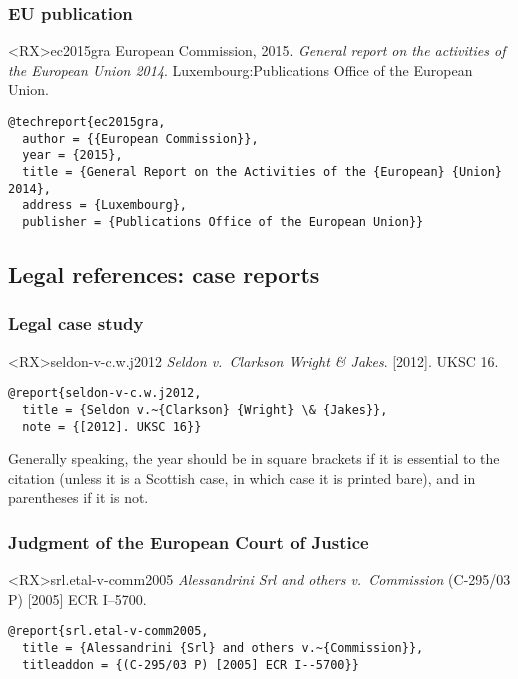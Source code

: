 \documentclass[10pt,a4paper]{article}
\newenvironment{info}{%
  \begin{list}{\makebox[2em][c]{\faInfoCircle}}{%
    \setlength{\leftmargin}{2em}
    \setlength{\labelwidth}{2em}
    \setlength{\labelsep}{0pt}}
}{\end{list}}
\begin{document}
\subsubsection*{EU publication}

\begin{bibexbox}<RX>{ec2015gra}
  European Commission, 2015. \emph{General report on the activities of the European Union 2014}. Luxembourg:\@ Publications Office of the European Union.
  \tcblower
\begin{Verbatim}
@techreport{ec2015gra,
  author = {{European Commission}},
  year = {2015},
  title = {General Report on the Activities of the {European} {Union} 2014},
  address = {Luxembourg},
  publisher = {Publications Office of the European Union}}
\end{Verbatim}
\end{bibexbox}

\subsection{Legal references: case reports}

\subsubsection*{Legal case study}

\begin{bibexbox}<RX>{seldon-v-c.w.j2012}
  \emph{Seldon v.~Clarkson Wright \& Jakes}. [2012]. UKSC 16.
  \tcblower
\begin{Verbatim}
@report{seldon-v-c.w.j2012,
  title = {Seldon v.~{Clarkson} {Wright} \& {Jakes}},
  note = {[2012]. UKSC 16}}
\end{Verbatim}
\end{bibexbox}

\begin{info}\item
Generally speaking, the year should be in square brackets if it is essential to the citation
(unless it is a Scottish case, in which case it is printed bare), and in parentheses if it is
not.
\end{info}

\subsubsection*{Judgment of the European Court of Justice}

\begin{bibexbox}<RX>{srl.etal-v-comm2005}
  \emph{Alessandrini Srl and others v.~Commission} (C-295/03 P) [2005] ECR I--5700.
  \tcblower
\begin{Verbatim}
@report{srl.etal-v-comm2005,
  title = {Alessandrini {Srl} and others v.~{Commission}},
  titleaddon = {(C-295/03 P) [2005] ECR I--5700}}
\end{Verbatim}
\end{bibexbox}



\end{document}
